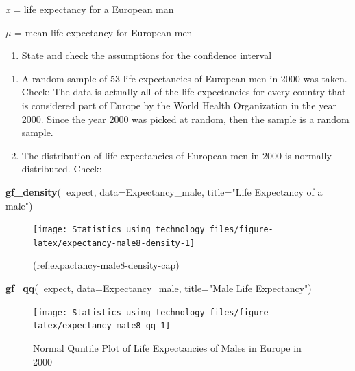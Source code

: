 \documentclass[
]{book}
\newenvironment{Shaded}{\begin{snugshade}}{\end{snugshade}}
\newcommand{\DataTypeTok}[1]{\textcolor[rgb]{0.13,0.29,0.53}{#1}}
\newcommand{\KeywordTok}[1]{\textcolor[rgb]{0.13,0.29,0.53}{\textbf{#1}}}
\newcommand{\NormalTok}[1]{#1}
\newcommand{\OperatorTok}[1]{\textcolor[rgb]{0.81,0.36,0.00}{\textbf{#1}}}
\newcommand{\StringTok}[1]{\textcolor[rgb]{0.31,0.60,0.02}{#1}}
\providecommand{\tightlist}{%
  \setlength{\itemsep}{0pt}\setlength{\parskip}{0pt}}
\begin{document}
\emph{x} = life expectancy for a European man

\(\mu\) = mean life expectancy for European men

\begin{enumerate}
\def\labelenumi{\arabic{enumi}.}
\setcounter{enumi}{1}
\tightlist
\item
  State and check the assumptions for the confidence interval
\end{enumerate}

\begin{enumerate}
\def\labelenumi{\alph{enumi}.}
\item
  A random sample of 53 life expectancies of European men in 2000 was taken. Check: The data is actually all of the life expectancies for every country that is considered part of Europe by the World Health Organization in the year 2000. Since the year 2000 was picked at random, then the sample is a random sample.
\item
  The distribution of life expectancies of European men in 2000 is normally distributed. Check:
\end{enumerate}



\begin{Shaded}
\begin{Highlighting}[]
\KeywordTok{gf_density}\NormalTok{(}\OperatorTok{~}\NormalTok{expect, }\DataTypeTok{data=}\NormalTok{Expectancy_male, }\DataTypeTok{title=}\StringTok{"Life Expectancy of a male"}\NormalTok{)}
\end{Highlighting}
\end{Shaded}

\begin{figure}
\texttt{[image: Statistics\_using\_technology\_files/figure-latex/expectancy-male8-density-1]} \caption{(ref:expactancy-male8-density-cap)}\label{fig:expectancy-male8-density}
\end{figure}



\begin{Shaded}
\begin{Highlighting}[]
\KeywordTok{gf_qq}\NormalTok{(}\OperatorTok{~}\NormalTok{expect, }\DataTypeTok{data=}\NormalTok{Expectancy_male, }\DataTypeTok{title=}\StringTok{"Male Life Expectancy"}\NormalTok{)}
\end{Highlighting}
\end{Shaded}

\begin{figure}
\texttt{[image: Statistics\_using\_technology\_files/figure-latex/expectancy-male8-qq-1]} \caption{Normal Quntile Plot of Life Expectancies of Males in Europe in 2000}\label{fig:expectancy-male8-qq}
\end{figure}
\end{document}

